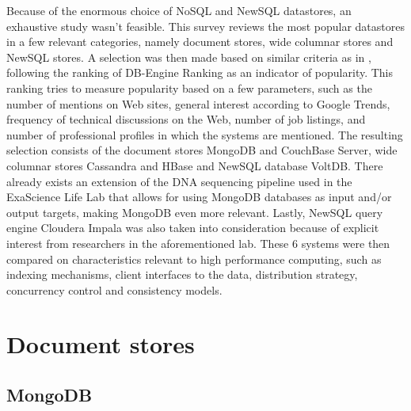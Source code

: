 \documentclass{IEEEtran}
\begin{document}
Because of the enormous choice of NoSQL and NewSQL datastores, an exhaustive study wasn't feasible. This survey reviews the most popular datastores in a few relevant categories, namely document stores, wide columnar stores and NewSQL stores. A selection was then made based on similar criteria as in \cite{grolinger2013data}, following the ranking of DB-Engine Ranking \cite{db_engine_rank} as an indicator of popularity. This ranking tries to measure popularity based on a few parameters, such as the number of mentions on Web sites, general interest according to Google Trends, frequency of technical discussions on the Web, number of job listings, and number of professional profiles in which the systems are mentioned. The resulting selection consists of the document stores MongoDB and CouchBase Server, wide columnar stores Cassandra and HBase and NewSQL database VoltDB. There already exists an extension of the DNA sequencing pipeline used in the ExaScience Life Lab that allows for using MongoDB databases as input and/or output targets, making MongoDB even more relevant\cite{elprep_mongo}. Lastly, NewSQL query engine Cloudera Impala was also taken into consideration because of explicit interest from researchers in the aforementioned lab.
These 6 systems were then compared on characteristics relevant to high performance computing, such as indexing mechanisms, client interfaces to the data, distribution strategy, concurrency control and consistency models.

\begin{landscape}

\end{landscape}
\section{Document stores}

\subsection{MongoDB}
\end{document}
